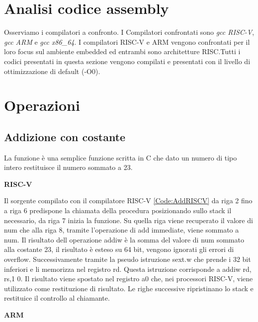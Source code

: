 \documentclass[12pt,a4paper]{report}
\begin{document}
	
\section{Analisi codice assembly}
Osserviamo i compilatori a confronto.  I Compilatori confrontati sono \textit{gcc RISC-V},  \textit{gcc ARM} e \textit{gcc x86\_64}.  I compilatori RISC-V e ARM vengono confrontati per il loro focus sul ambiente embedded ed entrambi sono architetture RISC.Tutti i codici presentati in questa sezione vengono compilati e presentati con il livello di ottimizzazione di default (-O0).


\section{Operazioni}
\subsection{Addizione con costante}



La funzione è una semplice funzione scritta in C che dato un numero di tipo intero restituisce il numero sommato a 23. 

\vspace{0.3 cm}
\textbf{RISC-V}

\vspace{0.3 cm}
Il sorgente compilato con il compilatore RISC-V \ref{Code:AddRISCV} da riga 2 fino a riga 6 predispone la chiamata della procedura posizionando sullo stack il necessario, da riga 7 inizia la funzione. Su quella riga viene recuperato il valore di num che alla riga 8, tramite l'operazione di add immediate, viene sommato a num. Il risultato dell operazione addiw è la somma del valore di num sommato alla costante 23, il risultato è esteso su 64 bit, vengono ignorati gli errori di overflow. Successivamente tramite la pseudo istruzione sext.w che prende i 32 bit inferiori e li memorizza nel registro rd.  Questa istruzione corrisponde a addiw rd, rs,1 0. Il risultato viene spostato nel registro a0 che, nei processori RISC-V, viene utilizzato come restituzione di risultato. Le righe successive ripristinano lo stack e restituice il controllo al chiamante.

\vspace{0.3 cm}
\textbf{ARM}

\vspace{0.3 cm}
\end{document}
